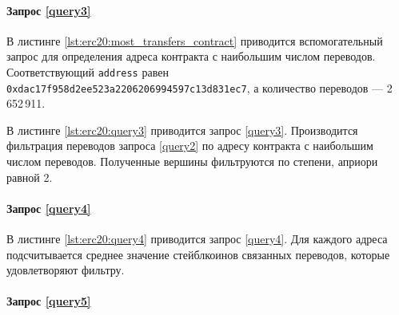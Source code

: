 \paragraph{Запрос \ref{query3}}

В листинге \ref{lst:erc20:most_transfers_contract} приводится вспомогательный запрос для определения адреса контракта
с наибольшим числом переводов. Соответствующий \texttt{address} равен \texttt{0xdac17f958d2ee523a2206206994597c13d831ec7}, а
количество переводов --- 2\,652\,911.


В листинге \ref{lst:erc20:query3} приводится запрос \ref{query3}. Производится фильтрация переводов запроса \ref{query2}
по адресу контракта с наибольшим числом переводов. Полученные вершины фильтруются по степени, априори равной 2.


\paragraph{Запрос \ref{query4}}

В листинге \ref{lst:erc20:query4} приводится запрос \ref{query4}. Для каждого адреса подсчитывается среднее значение
стейблкоинов связанных переводов, которые удовлетворяют фильтру.


\paragraph{Запрос \ref{query5}}

